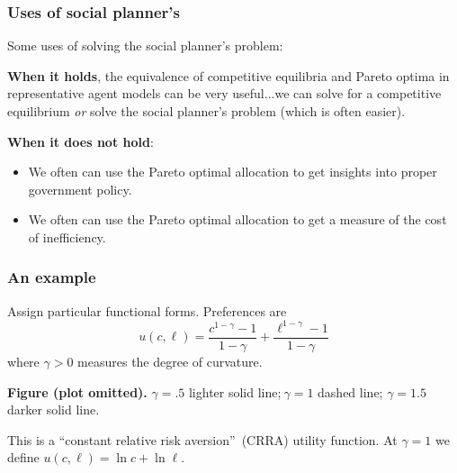 \documentclass[aspectratio=169]{ltx-talk}
\begin{document}
\begin{frame}
\frametitle{Uses of social planner{'}s }
Some uses of solving the social planner's problem:

\noindent \textbf{When it holds}, the equivalence of competitive equilibria
and Pareto optima in representative agent models can be very useful...we can
solve for a competitive equilibrium \textit{or} solve the social planner's
problem (which is often easier).

\noindent \textbf{When it does not hold}:

\begin{itemize}
\item We often can use the Pareto optimal allocation to get insights into
proper government policy.

\item We often can use the Pareto optimal allocation to get a measure of the
cost of inefficiency.
\end{itemize}
\end{frame}

\begin{frame}
\frametitle{An example}
Assign particular functional forms. Preferences are 
\begin{equation*}
u\left( c,\ell \right) =\frac{c^{1-\gamma }-1}{1-\gamma }+\frac{\ell
^{1-\gamma }-1}{1-\gamma }
\end{equation*}%
where $\gamma >0$ measures the degree of curvature.
\par\noindent\textbf{Figure (plot omitted).} $\gamma =.5$ lighter solid line;$\ \gamma =1$
dashed line; $\gamma =1.5$ darker solid line.\par


This is a \textquotedblleft constant relative risk
aversion\textquotedblright\ (CRRA) utility function. At $\gamma =1$ we
define $u\left( c,\ell \right) =\ln c+\ln \ell .$
\par{}
\end{frame}
\end{document}
